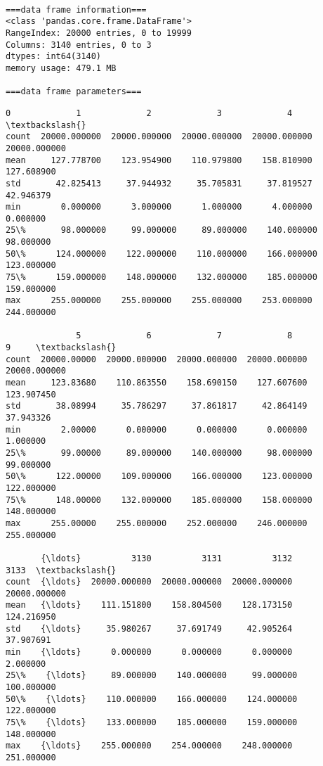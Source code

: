     \begin{Verbatim}[commandchars=\\\{\}]

===data frame information===
<class 'pandas.core.frame.DataFrame'>
RangeIndex: 20000 entries, 0 to 19999
Columns: 3140 entries, 0 to 3
dtypes: int64(3140)
memory usage: 479.1 MB

===data frame parameters===
    \end{Verbatim}

            \begin{tcolorbox}[breakable, size=fbox, boxrule=.5pt, pad at break*=1mm, opacityfill=0]
\begin{Verbatim}[commandchars=\\\{\}]
               0             1             2             3             4     \textbackslash{}
count  20000.000000  20000.000000  20000.000000  20000.000000  20000.000000
mean     127.778700    123.954900    110.979800    158.810900    127.608900
std       42.825413     37.944932     35.705831     37.819527     42.946379
min        0.000000      3.000000      1.000000      4.000000      0.000000
25\%       98.000000     99.000000     89.000000    140.000000     98.000000
50\%      124.000000    122.000000    110.000000    166.000000    123.000000
75\%      159.000000    148.000000    132.000000    185.000000    159.000000
max      255.000000    255.000000    255.000000    253.000000    244.000000

              5             6             7             8             9     \textbackslash{}
count  20000.00000  20000.000000  20000.000000  20000.000000  20000.000000
mean     123.83680    110.863550    158.690150    127.607600    123.907450
std       38.08994     35.786297     37.861817     42.864149     37.943326
min        2.00000      0.000000      0.000000      0.000000      1.000000
25\%       99.00000     89.000000    140.000000     98.000000     99.000000
50\%      122.00000    109.000000    166.000000    123.000000    122.000000
75\%      148.00000    132.000000    185.000000    158.000000    148.000000
max      255.00000    255.000000    252.000000    246.000000    255.000000

       {\ldots}          3130          3131          3132          3133  \textbackslash{}
count  {\ldots}  20000.000000  20000.000000  20000.000000  20000.000000
mean   {\ldots}    111.151800    158.804500    128.173150    124.216950
std    {\ldots}     35.980267     37.691749     42.905264     37.907691
min    {\ldots}      0.000000      0.000000      0.000000      2.000000
25\%    {\ldots}     89.000000    140.000000     99.000000    100.000000
50\%    {\ldots}    110.000000    166.000000    124.000000    122.000000
75\%    {\ldots}    133.000000    185.000000    159.000000    148.000000
max    {\ldots}    255.000000    254.000000    248.000000    251.000000


\end{Verbatim}
\end{tcolorbox}
